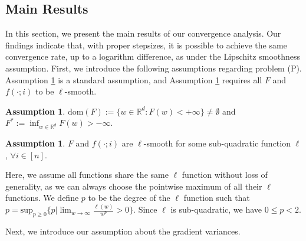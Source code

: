 \documentclass{article} %
\theoremstyle{plain}
\theoremstyle{definition}
\newtheorem{assumption}[theorem]{Assumption}
\theoremstyle{remark}
\begin{document}
\subsection{Main Results}

In this section, we present the main results of our convergence analysis. Our findings indicate that, with proper stepsizes, it is possible to achieve the same convergence rate, up to a logarithm difference, as under the Lipschitz smoothness assumption. First, we introduce the following assumptions regarding problem (P). Assumption \ref{assumption:first} is a standard assumption, and Assumption \ref{assumption:lsmooth} requires all $F$ and $f(\cdot;i)$ to be $\ell$-smooth.

\begin{assumption}
\label{assumption:first}
    $\mathrm{dom} (F):=\{w\in\mathbb{R}^d:F(w)<+\infty\}\neq \emptyset$ and $F^*:=\inf_{w\in\mathbb{R}^d} F(w)> -\infty.$
\end{assumption}

\begin{assumption}
\label{assumption:lsmooth}
$F$ and $f(\cdot;i)$ are $\ell$-smooth for some sub-quadratic function $\ell$, $\forall i\in[n]$.
\end{assumption}

Here, we assume all functions share the same $\ell$ function without loss of generality, as we can always choose the pointwise maximum of all their $\ell$ functions. We define $p$ to be the degree of the $\ell$ function such that $p = \text{sup}_{p\geq 0} \{p|\lim_{w\rightarrow\infty}\frac{\ell(w)}{w^p}>0\}.$
Since $\ell$ is sub-quadratic, we have $0\leq p < 2$. 

Next, we introduce our assumption about the gradient variances.


\end{document}
